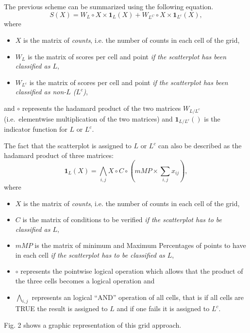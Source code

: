\documentclass[10pt,letterpaper]{article}
\begin{document}
The previous scheme can be summarized using the following equation.
\begin{equation}
S(X) = W_L \circ X \times \mathbf{1}_L(X) + W_{L^C} \circ X \times \mathbf{1}_{L^c}(X),
\end{equation} where

\begin{itemize}
\item ${X}$ is the matrix of \emph{counts}, i.e. the number of counts in each cell of the grid,
\item ${W_L}$ is the matrix of scores per cell and point \emph{if the scatterplot has been classified as $L$},
\item ${W_{L^c}}$ is the matrix of scores per cell and point \emph{if the scatterplot has been classified as non-$L$ ($L^c$)},
\end{itemize}

and \(\circ\) represents the hadamard product of the two matrices
\(W_{L/L^c}\) (i.e.~elementwise multiplication of the two matrices) and
\(\mathbf{1}_{L/L^c}()\) is the indicator function for \(L\) or \(L^c\).

The fact that the scatterplot is assigned to \(L\) or \(L^c\) can also
be described as the hadamard product of three matrices: \begin{equation}
\mathbf{1}_L(X) = \bigwedge_{i,j} X \circ C \circ \left( mMP \times \sum_{i,j}x_{ij}\right),
\end{equation} where

\begin{itemize}
\item ${X}$ is the matrix of \emph{counts}, i.e. the number of counts in each cell of the grid,
\item $C$ is the matrix of conditions to be verified \emph{if the scatterplot has to be classified as $L$},
\item $mMP$ is the matrix of minimum and Maximum Percentages of points to have in each cell \emph{if the scatterplot has to be classified as $L$},
\item $\circ$ represents the pointwise logical operation which allows that the product of the three cells becomes a logical operation and
\item $\bigwedge_{i,j}$ represents an logical ``AND'' operation of all cells, that is if all cells are TRUE the result is assigned to $L$ and if one fails it is assigned to $L^c$.
\end{itemize}

Fig. 2 shows a graphic representation of this grid approach.
\end{document}
